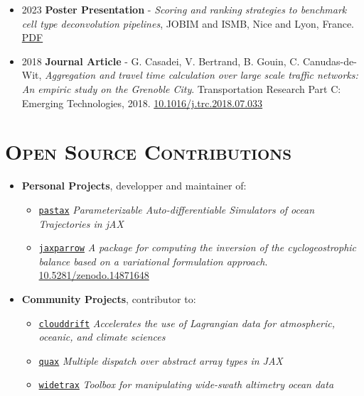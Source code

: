 \documentclass{article}
\begin{document}
\begin{itemize}
    \item[] 2023 \tabto{2cm} \textbf{Poster Presentation} - \textit{Scoring and ranking strategies to benchmark cell type deconvolution pipelines}, \tabto{2cm} JOBIM and ISMB, Nice and Lyon, France. \href{https://vadmbertr.github.io/material/posters/poster_jobim_ismb.pdf}{PDF}
    
    \item[] 2018 \tabto{2cm} \textbf{Journal Article} - G. Casadei, V. Bertrand, B. Gouin, C. Canudas-de-Wit, \textit{Aggregation and travel time \tabto{2cm} calculation over large scale traffic networks: An empiric study on the Grenoble City}. Transportation \tabto{2cm} Research Part C: Emerging Technologies, 2018. \href{https://doi.org/10.1016/j.trc.2018.07.033}{10.1016/j.trc.2018.07.033}
\end{itemize}

\section*{\textsc{Open Source Contributions}}
\begin{itemize}
    \item[] \textbf{Personal Projects}, developper and maintainer of:
        \begin{itemize}[leftmargin=2cm]
            \item[] \href{https://github.com/vadmbertr/pastax}{\texttt{pastax}} \textit{Parameterizable Auto-differentiable Simulators of ocean Trajectories in jAX}
            \item[] \href{https://github.com/meom-group/jaxparrow}{\texttt{jaxparrow}} \textit{A package for computing the inversion of the cyclogeostrophic balance based on a variational formulation approach}. \href{https://doi.org/10.5281/zenodo.14871648}{10.5281/zenodo.14871648}
        \end{itemize}
    \item[] \textbf{Community Projects}, contributor to:
        \begin{itemize}[leftmargin=2cm]
            \item[] \href{https://github.com/Cloud-Drift/clouddrift}{\texttt{clouddrift}} \textit{Accelerates the use of Lagrangian data for atmospheric, oceanic, and climate sciences}
            \item[] \href{https://github.com/patrick-kidger/quax}{\texttt{quax}} \textit{Multiple dispatch over abstract array types in JAX}
            \item[] \href{https://github.com/meom-group/widetrax}{\texttt{widetrax}} \textit{Toolbox for manipulating wide-swath altimetry ocean data}
        \end{itemize}
\end{itemize}
\end{document}
